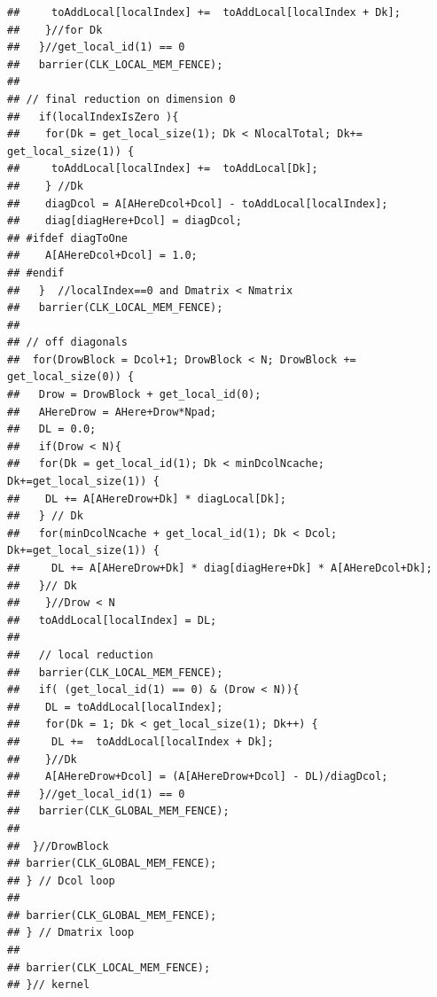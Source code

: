 \documentclass[article,nojss]{jss}\usepackage[]{graphicx}\usepackage[]{color}
\makeatletter
\newenvironment{kframe}{%
 \def\at@end@of@kframe{}%
 \ifinner\ifhmode%
  \def\at@end@of@kframe{\end{minipage}}%
  \begin{minipage}{\columnwidth}%
 \fi\fi%
 \def\FrameCommand##1{\hskip\@totalleftmargin \hskip-\fboxsep
 \colorbox{shadecolor}{##1}\hskip-\fboxsep
     \hskip-\linewidth \hskip-\@totalleftmargin \hskip\columnwidth}%
 \MakeFramed {\advance\hsize-\width
   \@totalleftmargin\z@ \linewidth\hsize
   \@setminipage}}%
 {\par\unskip\endMakeFramed%
 \at@end@of@kframe}
\newenvironment{knitrout}{}{} %
\makeatother
\begin{document}
\begin{knitrout}
\begin{kframe}
\begin{verbatim}
##     toAddLocal[localIndex] +=  toAddLocal[localIndex + Dk];
##    }//for Dk
##   }//get_local_id(1) == 0
##   barrier(CLK_LOCAL_MEM_FENCE);
## 
## // final reduction on dimension 0
##   if(localIndexIsZero ){
##    for(Dk = get_local_size(1); Dk < NlocalTotal; Dk+= get_local_size(1)) {
##     toAddLocal[localIndex] +=  toAddLocal[Dk];
##    } //Dk
##    diagDcol = A[AHereDcol+Dcol] - toAddLocal[localIndex];
##    diag[diagHere+Dcol] = diagDcol;
## #ifdef diagToOne
##    A[AHereDcol+Dcol] = 1.0;
## #endif
##   }  //localIndex==0 and Dmatrix < Nmatrix
##   barrier(CLK_LOCAL_MEM_FENCE);
## 
## // off diagonals
##  for(DrowBlock = Dcol+1; DrowBlock < N; DrowBlock += get_local_size(0)) {
##   Drow = DrowBlock + get_local_id(0);
##   AHereDrow = AHere+Drow*Npad;
##   DL = 0.0;
##   if(Drow < N){
##   for(Dk = get_local_id(1); Dk < minDcolNcache; Dk+=get_local_size(1)) {
##    DL += A[AHereDrow+Dk] * diagLocal[Dk];
##   } // Dk
## 	 for(minDcolNcache + get_local_id(1); Dk < Dcol; Dk+=get_local_size(1)) {
##     DL += A[AHereDrow+Dk] * diag[diagHere+Dk] * A[AHereDcol+Dk];
##   }// Dk
##    }//Drow < N
##   toAddLocal[localIndex] = DL;
## 
##   // local reduction
##   barrier(CLK_LOCAL_MEM_FENCE);
##   if( (get_local_id(1) == 0) & (Drow < N)){
##    DL = toAddLocal[localIndex];
##    for(Dk = 1; Dk < get_local_size(1); Dk++) {
##     DL +=  toAddLocal[localIndex + Dk];
##    }//Dk
##    A[AHereDrow+Dcol] = (A[AHereDrow+Dcol] - DL)/diagDcol;
##   }//get_local_id(1) == 0
##   barrier(CLK_GLOBAL_MEM_FENCE);
## 
##  }//DrowBlock
## barrier(CLK_GLOBAL_MEM_FENCE);
## } // Dcol loop
## 
## barrier(CLK_GLOBAL_MEM_FENCE);
## } // Dmatrix loop
## 
## barrier(CLK_LOCAL_MEM_FENCE);
## }// kernel
\end{verbatim}
\end{kframe}
\end{knitrout}
\end{document}
